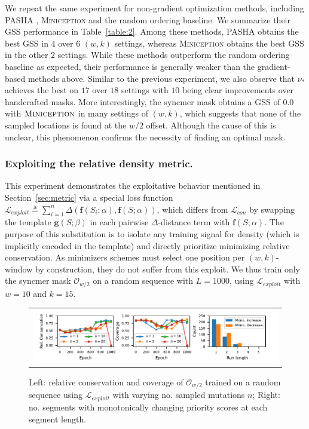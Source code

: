 We repeat the same experiment for non-gradient optimization methods, including PASHA \cite{ekim20pasha}, \textsc{Miniception}\cite{zheng20miniception} and the random ordering baseline. We summarize their GSS performance in Table~\ref{table:2}. Among these methods, \textsc{PASHA} obtains the best GSS in $4$ over $6$ $(w,k)$ settings, whereas \textsc{Miniception} obtains the best GSS in the other $2$ settings. While these methods outperform the random ordering baseline as expected, their performance is generally weaker than the gradient-based methods above. Similar to the previous experiment, we also observe that $\nu_\ast$ achieves the best on $17$ over $18$ settings with $10$ being clear improvements over handcrafted masks. More interestingly, the syncmer mask obtains a GSS of $0.0$ with $\textsc{Miniception}$ in many settings of $(w, k)$, which suggests that none of the sampled locations is found at the $w/2$ offset. Although the cause of this is unclear, this phenomenon confirms the necessity of finding an optimal mask.

\subsubsection{Exploiting the relative density metric.} This experiment demonstrates the exploitative behavior mentioned in Section~\ref{sec:metric} via a special loss function $\mathcal{L}_{exploit} \triangleq \sum_{i=1}^n \Delta(\mathbf{f}(S_i; \alpha),\mathbf{f}(S; \alpha))$, which differs from $\mathcal{L}_{con}$ by swapping the template $\mathbf{g}(S; \beta)$ in each pairwise $\Delta$-distance term with $\mathbf{f}(S; \alpha)$. The purpose of this substitution is to isolate any training signal for density (which is implicitly encoded in the template) and directly prioritize minimizing relative conservation. As minimizers schemes must select one position per $(w,k)$-window by construction, they do not suffer from this exploit. We thus train only the syncmer mask $\mathcal{O}_{w/2}$ on a random sequence with $L=1000$, using $\mathcal{L}_{exploit}$ with $w=10$ and $k=15$. 

\begin{figure}[ht]
\centering
\begin{tabular}{c}
\includegraphics[scale=1.1]{masked_mnz_plots/fig3/exploit2.pdf}
\end{tabular}
\caption{Left: relative conservation and coverage of $\mathcal{O}_{w/2}$ trained on a random sequence using $\mathcal{L}_{exploit}$ with varying no. sampled mutations $n$; Right: no. segments with monotonically changing priority scores at each segment length.}
\label{fig:3}
\end{figure}

